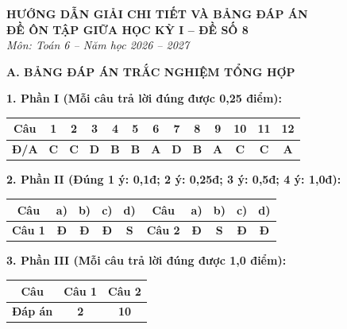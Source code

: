 \documentclass[12pt,a4paper]{article}
\begin{document}
\begin{center}
  \textbf{\Large HƯỚNG DẪN GIẢI CHI TIẾT VÀ BẢNG ĐÁP ÁN}\\
  \textbf{\large ĐỀ ÔN TẬP GIỮA HỌC KỲ I -- ĐỀ SỐ 8}\\
  \textit{Môn: Toán 6 -- Năm học 2026 -- 2027}
\end{center}
\vspace{2mm}

\noindent\textbf{\large A. BẢNG ĐÁP ÁN TRẮC NGHIỆM TỔNG HỢP}
\vspace{1.5mm}

\noindent\textbf{1. Phần I (Mỗi câu trả lời đúng được 0,25 điểm):}
\begin{center}
\begin{tabular}{|c|c|c|c|c|c|c|c|c|c|c|c|c|}
\hline
\textbf{Câu} & \textbf{1} & \textbf{2} & \textbf{3} & \textbf{4} & \textbf{5} & \textbf{6} & \textbf{7} & \textbf{8} & \textbf{9} & \textbf{10} & \textbf{11} & \textbf{12} \\
\hline
\textbf{Đ/A} & \textbf{C} & \textbf{C} & \textbf{D} & \textbf{B} & \textbf{B} & \textbf{A} & \textbf{D} & \textbf{B} & \textbf{A} & \textbf{C} & \textbf{C} & \textbf{A} \\
\hline
\end{tabular}
\end{center}
\vspace{1mm}

\noindent\textbf{2. Phần II (Đúng 1 ý: 0,1đ; 2 ý: 0,25đ; 3 ý: 0,5đ; 4 ý: 1,0đ):}
\begin{center}
\begin{tabular}{|c|c|c|c|c||c|c|c|c|c|}
\hline
\textbf{Câu} & \textbf{a)} & \textbf{b)} & \textbf{c)} & \textbf{d)} & \textbf{Câu} & \textbf{a)} & \textbf{b)} & \textbf{c)} & \textbf{d)} \\
\hline
\textbf{Câu 1} & \textbf{Đ} & \textbf{Đ} & \textbf{Đ} & \textbf{S} & \textbf{Câu 2} & \textbf{Đ} & \textbf{S} & \textbf{Đ} & \textbf{Đ} \\
\hline
\end{tabular}
\end{center}
\vspace{1mm}

\noindent\textbf{3. Phần III (Mỗi câu trả lời đúng được 1,0 điểm):}
\begin{center}
\begin{tabular}{|c|c|c|}
\hline
\textbf{Câu} & \textbf{Câu 1} & \textbf{Câu 2} \\
\hline
\textbf{Đáp án} & \textbf{2} & \textbf{10} \\
\hline
\end{tabular}
\end{center}
\vspace{3mm}
\end{document}
